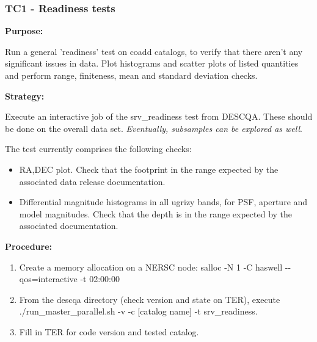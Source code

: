 \documentclass[12pt, a4paper]{article}
\begin{document}





\subsubsection{TC1 - Readiness tests}
\textbf{Purpose:} 

Run a general 'readiness' test on coadd catalogs, to verify that there aren't any significant issues in data. Plot histograms and scatter plots of listed quantities and perform range, finiteness, mean and standard deviation checks.

\textbf{Strategy:} 

Execute an interactive job of the srv\_readiness test from DESCQA. These should be done on the overall data set.  \textit{Eventually, subsamples can be explored as well}.

The test currently comprises the following checks:
\begin{itemize}
	\item RA,DEC plot. Check that the footprint in the range expected by the associated data release documentation.
	\item Differential magnitude histograms in all ugrizy bands, for PSF, aperture and model magnitudes. Check that the depth is in the range expected by the associated documentation.
\end{itemize}

\textbf{Procedure:} 

\begin{enumerate}
	\item Create a memory allocation on a NERSC node: salloc -N 1 -C haswell -{}-qos=interactive -t 02:00:00
	\item From the descqa directory (check version and state on TER), execute ./run\_master\_parallel.sh -v -c [catalog name] -t srv\_readiness. 
	\item Fill in TER for code version and tested catalog.
\end{enumerate}
\end{document}
